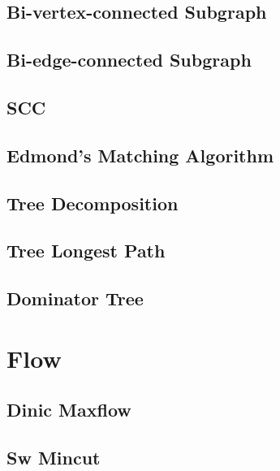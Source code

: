 \documentclass[10pt,twocolumn,oneside]{article}
\begin{document}
\subsection{Bi-vertex-connected Subgraph}

\subsection{Bi-edge-connected Subgraph}

\subsection{SCC}

%
\subsection{Edmond's Matching Algorithm}

\subsection{Tree Decomposition}

\subsection{Tree Longest Path}

\subsection{Dominator Tree}


\section{Flow}

\subsection{Dinic Maxflow}

\subsection{Sw Mincut}

\end{document}
